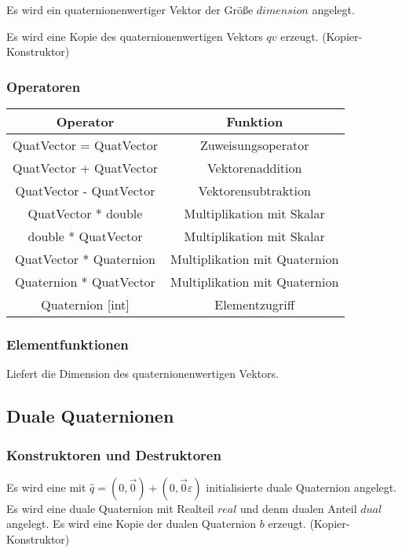 \descr
{
Es wird ein quaternionenwertiger Vektor der Größe $dimension$ angelegt.
}

\descr
{
Es wird eine Kopie des quaternionenwertigen Vektors $qv$ erzeugt.
(Kopier-Konstruktor)
}

\subsubsection{Operatoren}
\begin{tabular}{|c|c|}
\hline
Operator & Funktion\\ 
\hline
QuatVector = QuatVector & Zuweisungsoperator\\
\hline
QuatVector + QuatVector & Vektorenaddition\\
\hline
QuatVector - QuatVector & Vektorensubtraktion\\
\hline
QuatVector * double & Multiplikation mit Skalar\\
\hline
double * QuatVector & Multiplikation mit Skalar\\
\hline
QuatVector * Quaternion & Multiplikation mit Quaternion\\
\hline
Quaternion * QuatVector & Multiplikation mit Quaternion\\
\hline
Quaternion [int] & Elementzugriff
\end{tabular}

\subsubsection{Elementfunktionen}
\descr
{
Liefert die Dimension des quaternionenwertigen Vektors.
}
\subsection{Duale Quaternionen}
\hypertarget{DualQuaternion}{}
\subsubsection{Konstruktoren und Destruktoren}
\descr
{
Es wird eine mit $\hat{q}=(0,\vec{0})+(0,\vec{0}\varepsilon)$ initialisierte duale
Quaternion angelegt.
}
\descr
{
Es wird eine duale Quaternion mit Realteil $real$ und denm dualen Anteil 
$dual$ angelegt.
}
\descr
{
Es wird eine Kopie der dualen Quaternion $b$ erzeugt. (Kopier-Konstruktor)
}

